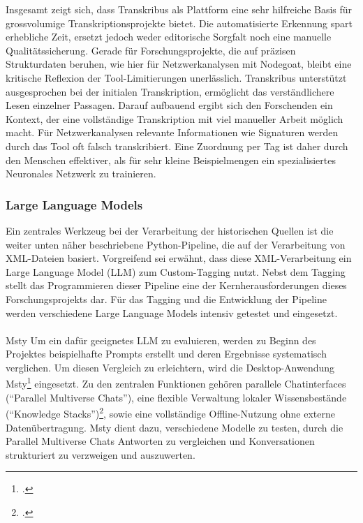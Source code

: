 \documentclass[12pt, a4paper, ngerman, bidi=default]{article}
\makeatletter
\let\cite\footcite
\let\oldparagraph\paragraph%
\renewcommand{\paragraph}{
    \@ifstar%
      \xxxParagraphStar%
      \xxxParagraphNoStar%
 }
\newcommand{\xxxParagraphStar}[1]{\oldparagraph*{#1}\mbox{}}
\newcommand{\xxxParagraphNoStar}[1]{\oldparagraph{#1}\mbox{}}
\makeatother
\begin{document}
Insgesamt zeigt sich, dass Transkribus als Plattform eine sehr hilfreiche Basis für grossvolumige Transkriptionsprojekte bietet. Die automatisierte Erkennung spart erhebliche Zeit,
ersetzt jedoch weder editorische Sorgfalt noch eine manuelle Qualitätssicherung. Gerade für Forschungsprojekte, die auf präzisen Strukturdaten beruhen, wie hier für Netzwerkanalysen
mit Nodegoat, bleibt eine kritische Reflexion der Tool-Limitierungen unerlässlich. Transkribus unterstützt ausgesprochen bei der initialen Transkription, ermöglicht das verständlichere 
Lesen einzelner Passagen. Darauf aufbauend ergibt sich den Forschenden ein Kontext, der eine vollständige Transkription mit viel manueller Arbeit möglich macht. Für Netzwerkanalysen 
relevante Informationen wie Signaturen werden durch das Tool oft falsch transkribiert. Eine Zuordnung per Tag ist daher durch den Menschen effektiver, als für sehr kleine Beispielmengen ein 
spezialisiertes Neuronales Netzwerk zu trainieren.


\subsubsection{Large Language Models}  
Ein zentrales Werkzeug bei der Verarbeitung der historischen Quellen ist die weiter unten näher beschriebene Python-Pipeline, die auf der Verarbeitung von XML-Dateien basiert. Vorgreifend sei erwähnt, dass diese XML-Verarbeitung ein Large Language Model (LLM) zum Custom-Tagging nutzt. Nebst dem Tagging stellt das Programmieren dieser Pipeline eine der Kernherausforderungen dieses Forschungsprojekts dar. 
Für das Tagging und die Entwicklung der Pipeline werden verschiedene Large Language Models intensiv getestet und eingesetzt.
\paragraph{Msty}
Um ein dafür geeignetes LLM zu evaluieren, werden zu Beginn des Projektes beispielhafte Prompts erstellt und deren Ergebnisse systematisch verglichen. Um diesen Vergleich zu erleichtern, wird die Desktop-Anwendung Msty\cite[vgl][]{noauthor_msty_nodate} eingesetzt. Zu den zentralen Funktionen gehören parallele Chatinterfaces (\enquote{Parallel Multiverse Chats}),
eine flexible Verwaltung lokaler Wissensbestände (\enquote{Knowledge Stacks})\cite[vgl][]{noauthor_msty_nodate}, sowie eine vollständige Offline-Nutzung ohne externe Datenübertragung. Msty dient dazu, verschiedene Modelle zu testen, durch die Parallel Multiverse Chats Antworten zu vergleichen und Konversationen strukturiert zu verzweigen und auszuwerten.
\end{document}
